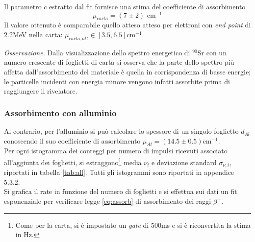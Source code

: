 Il parametro $c$ estratto dal fit fornisce una stima del coefficiente di assorbimento $$\mu_{carta} = ( 7\pm 2 ) \text{ cm$^{-1}$}$$ Il valore ottenuto è comparabile quello atteso atteso per elettroni con \textit{end point} di 2.2MeV nella carta:
$\mu_{carta,att}\in [ 3.5,6.5]\text{cm}^{-1}$. 

\textit{Osservazione.} Dalla visualizzazione dello spettro energetico di ${}^{90}$Sr con un numero crescente di foglietti di carta si osserva che la parte dello spettro più affetta dall'assorbimento del materiale è quella in corrispondenza di basse energie; le particelle incidenti con energia minore vengono infatti assorbite prima di raggiungere il rivelatore.

\subsubsection{Assorbimento con alluminio}
Al contrario, per l'alluminio si può calcolare lo spessore di un singolo foglietto $d_{Al}$ conoscendo il suo coefficiente di assorbimento $\mu_{Al}=(14.5 \pm 0.5) \text{cm}^{-1}$. \\
Per ogni istogramma dei conteggi per numero di impulsi ricevuti associato all'aggiunta dei foglietti, si estraggono\footnote{Come per la carta, si è impostato un \textit{gate} di 500ms e si è riconvertita la stima in Hz.} media $\nu_i$ e deviazione standard $\sigma_{\nu,i}$, riportati in tabella \ref{tab:all}. Tutti gli istogrammi sono riportati in appendice 5.3.2.\\
Si grafica il rate in funzione del numero di foglietti e si effettua sui dati un fit esponenziale per verificare legge \ref{eq:assorb} di assorbimento dei raggi $\beta^-$.\\

